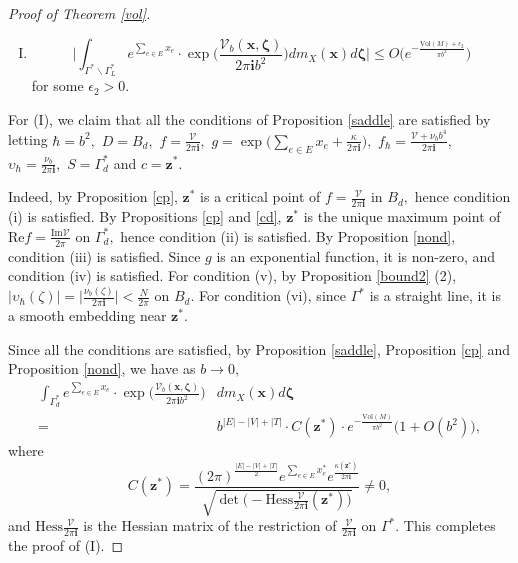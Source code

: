 \documentclass[11pt]{article}
\renewcommand{\setminus}{{\smallsetminus}}
\theoremstyle{remark}
\theoremstyle{remark}
\numberwithin{equation}{section}
\begin{document}
\begin{proof}[Proof of Theorem \ref{vol}]
\begin{enumerate}[(I)]
\item

$$
\bigg|\int_{\Gamma^*\setminus \Gamma^*_L} e^{\sum_{e\in E}x_e}\cdot\exp\bigg(\frac{\mathcal V_b(\boldsymbol x, \boldsymbol \zeta)}{2\pi \mathbf i b^2}\bigg)dm_X(\boldsymbol x)  d \boldsymbol \zeta\bigg|\leqslant  O\bigg( e^{-\frac{\mathrm{Vol}(M)+\epsilon_2}{\pi b^2}}\bigg)
$$
for some $\epsilon_2>0.$ 
\end{enumerate}
\medskip





For (I), we claim that  all the conditions of Proposition \ref{saddle} are satisfied by letting $\hbar=b^2,$ $D=B_d,$ $f=\frac{\mathcal V}{2\pi \mathbf i},$ $g=\exp\big(\sum_{e\in E}x_e+\frac{\kappa}{2\pi \mathbf i }\big),$ $f_\hbar=\frac{\mathcal V+\nu_b b^4}{2\pi \mathbf i},$ $\upsilon_\hbar=\frac{\nu_{b}}{2\pi \mathbf i},$ $S=\Gamma^*_d$ and $c=\boldsymbol z^*.$ 

Indeed, by Proposition \ref{cp}, $\boldsymbol z^*$ is a critical point of $f=\frac{\mathcal V}{2\pi \mathbf i}$ in $B_{d},$ hence condition (i) is satisfied. 
By Propositions \ref{cp} and \ref{cd}, $\boldsymbol z^*$ is the unique maximum point of $\mathrm{Re}f=\frac{\mathrm{Im}\mathcal V}{2\pi}$ on $\Gamma^*_d,$ hence condition (ii) is satisfied. 
By Proposition \ref{nond}, condition (iii) is satisfied. 
Since $g$ is an exponential function, it is non-zero, and condition (iv) is satisfied.
For condition (v), by Proposition \ref{bound2} (2),  $|\upsilon_{\hbar}(\zeta)|=\big|\frac{\nu_{b}(\zeta)}{2\pi \mathbf i}\big|<\frac{N}{2\pi}$ on $B_{d}.$ 
For condition (vi), since $\Gamma^*$ is a straight line, it is a smooth embedding near $\boldsymbol z^*.$  

Since all the conditions are satisfied, by Proposition \ref{saddle}, Proposition \ref{cp} and Proposition \ref{nond}, we have as $b\to 0,$
\begin{equation*}
\begin{split}
    \int_{\Gamma^*_d} e^{\sum_{e\in E}x_e}\cdot\exp\bigg(\frac{\mathcal V_b(\boldsymbol x, \boldsymbol \zeta)}{2\pi \mathbf i b^2}\bigg)&dm_X(\boldsymbol x)  d \boldsymbol \zeta\\
    =& b^{|E|-|V|+|T|}\cdot C(\boldsymbol z^*)\cdot  e^{-\frac{\mathrm{Vol}(M)}{\pi b^2}}\big(1+O(b^2)\big),
\end{split}
\end{equation*}
where
$$C(\boldsymbol z^*) = \frac{(2\pi)^{\frac{|E|-|V|+|T|}{2}}e^{\sum_{e\in E}x^*_e}e^{\frac{\kappa(\boldsymbol z^*)}{2\pi \mathbf i} }}{\sqrt{\det\Big(-\mathrm{Hess}\frac{\mathcal V}{2\pi \mathbf i}(\boldsymbol z^*)\Big)}}\neq 0,$$
and $\mathrm{Hess}\frac{\mathcal V}{2\pi \mathbf i}$ is  the Hessian matrix of the restriction of $\frac{\mathcal V}{2 \pi\mathbf i}$ on $\Gamma^*.$
This completes the proof of (I). 
\medskip




\end{proof}
\end{document}
